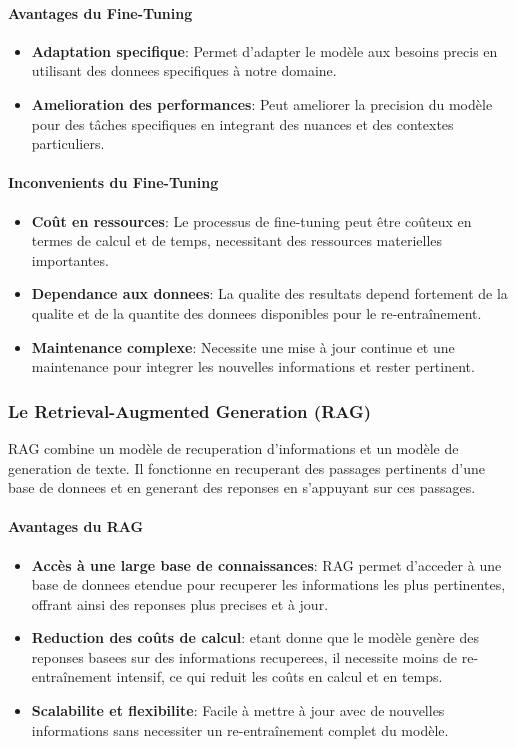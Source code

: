 \documentclass[a4paper, 11pt, openany]{report}
\begin{document}
\paragraph{Avantages du Fine-Tuning}
\begin{itemize}
    \item \textbf{Adaptation specifique}: Permet d’adapter le modèle aux besoins precis en utilisant des donnees specifiques à notre domaine.
    \item \textbf{Amelioration des performances}: Peut ameliorer la precision du modèle pour des tâches specifiques en integrant des nuances et des contextes particuliers.
\end{itemize}

\paragraph{Inconvenients du Fine-Tuning}
\begin{itemize}
    \item \textbf{Coût en ressources}: Le processus de fine-tuning peut être coûteux en termes de calcul et de temps, necessitant des ressources materielles importantes.
    \item \textbf{Dependance aux donnees}: La qualite des resultats depend fortement de la qualite et de la quantite des donnees disponibles pour le re-entraînement.
    \item \textbf{Maintenance complexe}: Necessite une mise à jour continue et une maintenance pour integrer les nouvelles informations et rester pertinent.
\end{itemize}

\subsubsection{Le Retrieval-Augmented Generation (RAG)}
RAG combine un modèle de recuperation d'informations et un modèle de generation de texte. Il fonctionne en recuperant des passages pertinents d'une base de donnees et en generant des reponses en s'appuyant sur ces passages.

\paragraph{Avantages du RAG}
\begin{itemize}
    \item \textbf{Accès à une large base de connaissances}: RAG permet d'acceder à une base de donnees etendue pour recuperer les informations les plus pertinentes, offrant ainsi des reponses plus precises et à jour.
    \item \textbf{Reduction des coûts de calcul}: etant donne que le modèle genère des reponses basees sur des informations recuperees, il necessite moins de re-entraînement intensif, ce qui reduit les coûts en calcul et en temps.
    \item \textbf{Scalabilite et flexibilite}: Facile à mettre à jour avec de nouvelles informations sans necessiter un re-entraînement complet du modèle.
\end{itemize}
\end{document}
